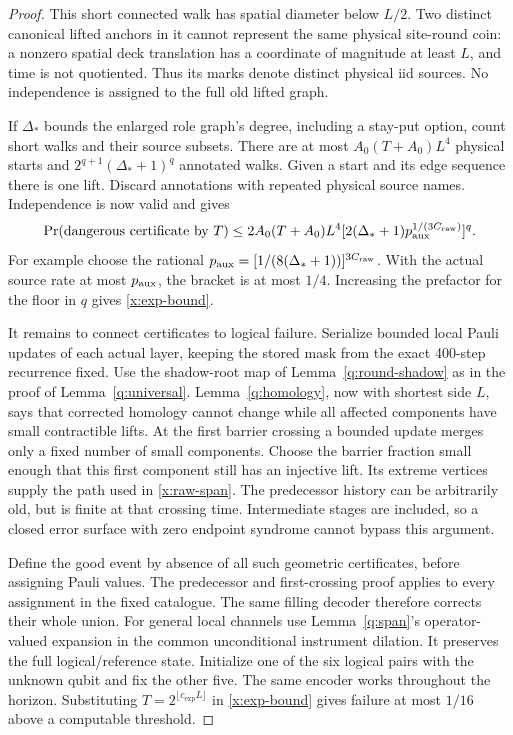 \begin{proof}
This short connected walk has spatial diameter below \(L/2\).
Two distinct canonical lifted anchors in it cannot represent the
same physical site-round coin: a nonzero spatial deck translation
has a coordinate of magnitude at least \(L\), and time is not
quotiented. Thus its marks denote distinct physical iid sources.
No independence is assigned to the full old lifted graph.

If \(\Delta_*\) bounds the enlarged role graph's degree, including
a stay-put option, count short walks and their source subsets.
There are at most \(A_0(T+A_0)L^4\) physical starts and
\(2^{q+1}(\Delta_*+1)^q\) annotated walks. Given a start and its
edge sequence there is one lift. Discard annotations with repeated
physical source names. Independence is now valid and gives
\[
 \Pr(\text{dangerous certificate by }T)
 \le2A_0(T+A_0)L^4
       [2(\Delta_*+1)p_{\rm aux}^{1/(3C_{\rm raw})}]^q.
\]
For example choose the rational
\(p_{\rm aux}=[1/(8(\Delta_*+1))]^{3C_{\rm raw}}\).
With the actual source rate at most \(p_{\rm aux}\), the bracket is at most \(1/4\). Increasing the prefactor for the
floor in \(q\) gives \eqref{x:exp-bound}.

It remains to connect certificates to logical failure. Serialize
bounded local Pauli updates of each actual layer, keeping the stored
mask from the exact 400-step recurrence fixed. Use the shadow-root map
of Lemma~\ref{q:round-shadow} as in the proof of Lemma~\ref{q:universal}. Lemma~\ref{q:homology}, now with shortest side
\(L\), says that corrected homology cannot change while all affected
components have small contractible lifts. At the first barrier
crossing a bounded update merges only a fixed number of small
components. Choose the barrier fraction small enough that this first
component still has an injective lift. Its extreme vertices supply
the path used in \eqref{x:raw-span}. The predecessor history can be
arbitrarily old, but is finite at that crossing time. Intermediate
stages are included, so a closed error surface with zero endpoint
syndrome cannot bypass this argument.

Define the good event by absence of all such geometric certificates,
before assigning Pauli values. The predecessor and first-crossing
proof applies to every assignment in the fixed catalogue. The same
filling decoder therefore corrects their whole union. For general
local channels use Lemma~\ref{q:span}'s operator-valued expansion in
the common unconditional instrument dilation. It preserves the full
logical/reference state. Initialize one of the six logical pairs with
the unknown qubit and fix the other five. The same encoder works
throughout the horizon. Substituting
\(T=2^{\lfloor c_{\exp}L\rfloor}\) in \eqref{x:exp-bound} gives
failure at most \(1/16\) above a computable threshold.
\end{proof}

